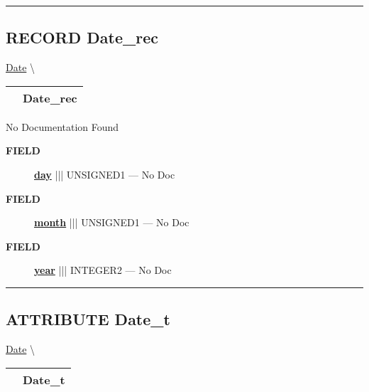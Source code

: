 \rule{\linewidth}{0.5pt}

\subsection*{\textsf{\colorbox{headtoc}{\color{white} RECORD}
Date\_rec}}

\hypertarget{ecldoc:date.date_rec}{}
\hspace{0pt} \hyperlink{ecldoc:Date}{Date} \textbackslash 

{\renewcommand{\arraystretch}{1.5}
\begin{tabularx}{\textwidth}{|>{\raggedright\arraybackslash}l|X|}
\hline
\hspace{0pt}\mytexttt{\color{red} } & \textbf{Date\_rec} \\
\hline
\end{tabularx}
}

\par





No Documentation Found







\par
\begin{description}
\item [\colorbox{tagtype}{\color{white} \textbf{\textsf{FIELD}}}] \textbf{\underline{day}} ||| UNSIGNED1 --- No Doc
\item [\colorbox{tagtype}{\color{white} \textbf{\textsf{FIELD}}}] \textbf{\underline{month}} ||| UNSIGNED1 --- No Doc
\item [\colorbox{tagtype}{\color{white} \textbf{\textsf{FIELD}}}] \textbf{\underline{year}} ||| INTEGER2 --- No Doc
\end{description}





\rule{\linewidth}{0.5pt}
\subsection*{\textsf{\colorbox{headtoc}{\color{white} ATTRIBUTE}
Date\_t}}

\hypertarget{ecldoc:date.date_t}{}
\hspace{0pt} \hyperlink{ecldoc:Date}{Date} \textbackslash 

{\renewcommand{\arraystretch}{1.5}
\begin{tabularx}{\textwidth}{|>{\raggedright\arraybackslash}l|X|}
\hline
\hspace{0pt}\mytexttt{\color{red} } & \textbf{Date\_t} \\
\hline
\end{tabularx}
}

